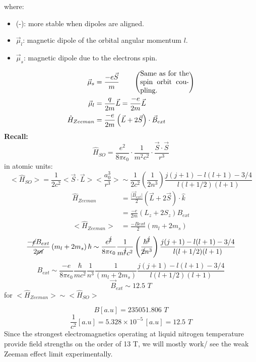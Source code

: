 \documentclass[12pt,fancychapters]{report}
\numberwithin{equation}{section}
\begin{document}
where:
\begin{itemize}
  \item (-): more stable when dipoles are aligned.
  \item $\vec{\mu}_l$: magnetic dipole of the orbital angular momentum $l$.
  \item $\vec{\mu}_s$: magnetic dipole due to the electrons spin.
\end{itemize}
\begin{align*}
  \vec{\mu}_s &= \frac{-e\vec{S}}{m} \qquad 
  \left(\parbox{0.2\textwidth}{Same as for the spin orbit 
coupling.}\right)\\
  \vec{\mu}_l &= \frac{q}{2m}\vec{L} = \frac{-e}{2m}\vec{L}\\
  \hat{H}_{Zeeman} &= \frac{-e}{2m}\left(\vec{L}+2\vec{S}\right)\cdot \vec{B}_{ext}
\end{align*}
\textbf{Recall:}
\[
  \hat{H}_{SO} = \frac{e^2}{8\pi\epsilon_0}\cdot \frac{1}{m^2c^2}\cdot \frac{\vec{S}\cdot\vec{S}}
  {r^3}
\]
in atomic units:
\[
  \big<\hat{H}_{SO}\big> = \frac{1}{2c^2}\big<\vec{S}\cdot\vec{L}\big>\bigg<\frac{a_0^3}{r^3}
  \bigg> \sim \frac{1}{2c^2}\left(\frac{1}{2n^3}\right)\frac{j(j+1)-l(l+1)-3/4}{l(l+1/2)(l+1)}
\]
\begin{align*}
  \hat{H}_{Zeeman} &= \frac{\big|\vec{B}_{ext}\big|}{2}\left(\vec{L}+2\vec{S}\right)\cdot \hat{k}\\
                   &= \frac{-e}{2m}\left(L_z + 2S_z\right)B_{ext}\\
  \big<\hat{H}_{Zeeman}\big> &= \frac{-B{ext}}{2}\left(m_l + 2m_s\right)
\end{align*}
\[
  \frac{-\cancel{e}B_{ext}}{2\cancel{m}}\left(m_l + 2m_s\right)\hbar \sim \frac{e^{\cancel{2}}}
  {8\pi\epsilon_0}\frac{1}{m^{\cancel{2}}c^2}\left(\frac{\hbar^{\cancel{2}}}{\cancel{2}n^3}
  \right)\frac{j(j+1)-l(l+1)-3/4}{l(l+1/2)(l+1)}
\]
\[
  B_{ext} \sim \frac{-e}{8\pi\epsilon_0} \frac{\hbar}{mc^2}\frac{1}{n^3}\frac{1}
  {\left(m_l + 2m_s\right)}\frac{j(j+1)-l(l+1)-3/4}{l(l+1/2)(l+1)}
\]
\[
  \boxed{\vec{B}_{ext} \sim 12.5\,\,T}
\]
for $\big<\hat{H}_{Zeeman} \big> \sim \big<\hat{H}_{SO}\big>$

\[B[a.u] = 235051.806\,\,T\]
\[\frac{1}{c^2}[a.u] = 5.328\times 10^{-5}\,[a.u] = 12.5\,\,T\]
Since the strongest electromagnetics operating at liquid nitrogen temperature provide field 
strengths on the order of 13 T, we will mostly work/ see the weak Zeeman effect limit 
experimentally.
\end{document}
